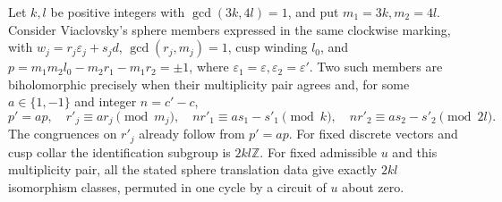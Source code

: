 \begin{proposition}[B.3.1; Proved]\label{st:B.3.1}
Let $k,l$ be positive integers with $\gcd(3k,4l)=1$, and put $m_1=3k,m_2=4l$. Consider Viaclovsky's sphere members expressed in the same clockwise marking, with $w_j=r_j\varepsilon_j+s_jd$, $\gcd(r_j,m_j)=1$, cusp winding $l_0$, and $p=m_1m_2l_0-m_2r_1-m_1r_2=\pm1$, where $\varepsilon_1=\varepsilon,\varepsilon_2=\varepsilon'$. Two such members are biholomorphic precisely when their multiplicity pair agrees and, for some $a\in\{1,-1\}$ and integer $n=c'-c$,
\[
 p'=ap,\quad r'_j\equiv ar_j\pmod{m_j},\quad
 nr'_1\equiv as_1-s'_1\pmod{k},\quad
 nr'_2\equiv as_2-s'_2\pmod{2l}.
\]
The congruences on $r'_j$ already follow from $p'=ap$. For fixed discrete vectors and cusp collar the identification subgroup is $2kl\mathbb Z$. For fixed admissible $u$ and this multiplicity pair, all the stated sphere translation data give exactly $2kl$ isomorphism classes, permuted in one cycle by a circuit of $u$ about zero.
\end{proposition}
